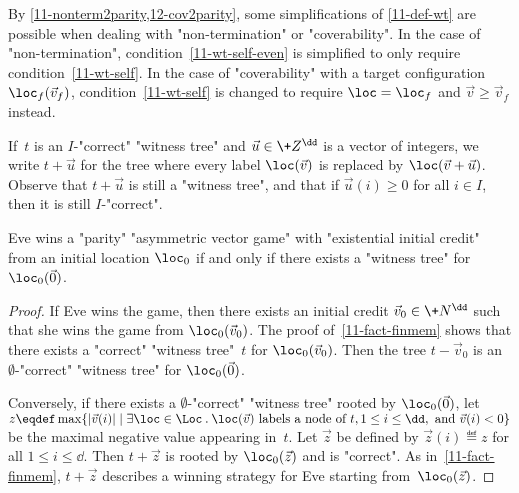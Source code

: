 \begin{remark}\label{11-rk-wt}
  By \cref{11-nonterm2parity,12-cov2parity}, some simplifications of
  \cref{11-def-wt} are possible when dealing with "non-termination" or
  "coverability". In the case of "non-termination",
  condition~\cref{11-wt-self-even} is simplified to only require
  condition~\cref{11-wt-self}.  In the case of "coverability" with a
  target configuration $\loc_f(\vec v_f)$, condition~\cref{11-wt-self}
  is changed to require $\loc=\loc_f$ and $\vec v\geq\vec v_f$
  instead.
\end{remark}

If~$t$ is an $I$-"correct" "witness tree" and $\vec u\in\+Z^\dd$ is a
vector of integers, we write $t+\vec u$ for the tree where
every label $\loc(\vec v)$ is replaced by $\loc(\vec v+\vec u)$.
Observe that $t+\vec u$ is still a "witness tree", and that if $\vec
u(i)\geq 0$ for all $i\in I$, then it is still $I$-"correct".

\begin{lemma}\label{11-lem-wt}
  Eve wins a "parity" "asymmetric vector game" with "existential
  initial credit" from an initial location $\loc_0$ if and only if
  there exists a "witness tree" for $\loc_0(\vec 0)$.
\end{lemma}
\begin{proof}
  If Eve wins the game, then there exists an initial credit
  $\vec v_0\in\+N^\dd$ such that she wins the game from
  $\loc_0(\vec v_0)$.  The proof of~\cref{11-fact-finmem} shows that
  there exists a "correct" "witness tree"~$t$ for $\loc_0(\vec v_0)$.
  Then the tree $t-\vec v_0$ is an $\emptyset$-"correct" "witness
  tree" for $\loc_0(\vec 0)$.

  Conversely, if there exists a $\emptyset$-"correct" "witness tree"
  rooted by $\loc_0(\vec 0)$, let
  $z\eqdef\max\{|\vec v(i)|\mid \exists\loc\in\Loc\mathbin.\loc(\vec
  v)\text{ labels a node of }t,1\leq i\leq \dd,\text{ and }\vec v(i)<0\}$
  be the maximal negative value appearing in~$t$.  Let $\vec z$ be
  defined by $\vec z(i)\eqdef z$ for all $1\leq i\leq\dd$.  Then
  $t+\vec z$ is rooted by $\loc_0(\vec z)$ and is "correct".  As
  in~\cref{11-fact-finmem}, $t+\vec z$ describes a winning strategy
  for Eve starting from~$\loc_0(\vec z)$.
\end{proof}


